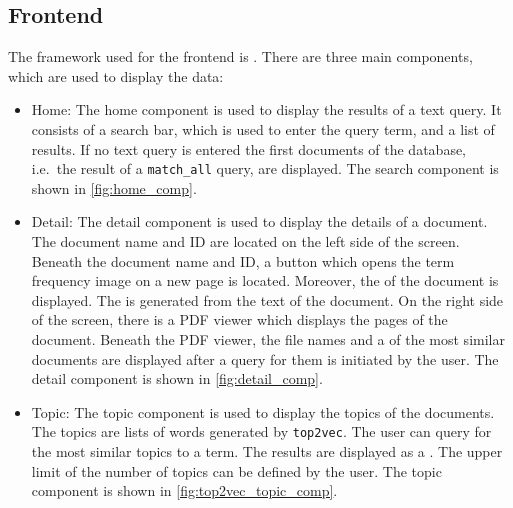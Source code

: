 




\subsection{Frontend}\label{subsec:frontend}

The framework used for the frontend is \angular{}.
There are three main components, which are used to display the data:

\begin{itemize}
    \item \label{pt:home}Home: 
        The home component is used to display the results of a text query.
        It consists of a search bar, which is used to enter the query term, and a list of results.
        If no text query is entered the first documents of the database, i.e.\ the result of a \texttt{match\_all} query, are displayed.
        The search component is shown in \autoref{fig:home_comp}.

    \item \label{pt:detail}Detail: 
        The detail component is used to display the details of a document.
        The document name and ID are located on the left side of the screen.
        Beneath the document name and ID, a button which opens the term frequency image on a new page is located. 
        Moreover, the \wordcloud{} of the document is displayed.
        The \wordcloud{} is generated from the text of the document.
        On the right side of the screen, there is a PDF viewer which displays the pages of the document.
        Beneath the PDF viewer, the file names and a \wordcloud{} of the most similar documents are displayed after a query for them is initiated by the user.
        The detail component is shown in \autoref{fig:detail_comp}.

    \item \label{pt:topic}Topic: 
        The topic component is used to display the topics of the documents.
        The topics are lists of words generated by \texttt{top2vec}.
        The user can query for the most similar topics to a term.
        The results are displayed as a \wordcloud{}.
        The upper limit of the number of topics can be defined by the user.
        The topic component is shown in \autoref{fig:top2vec_topic_comp}.
\end{itemize}


